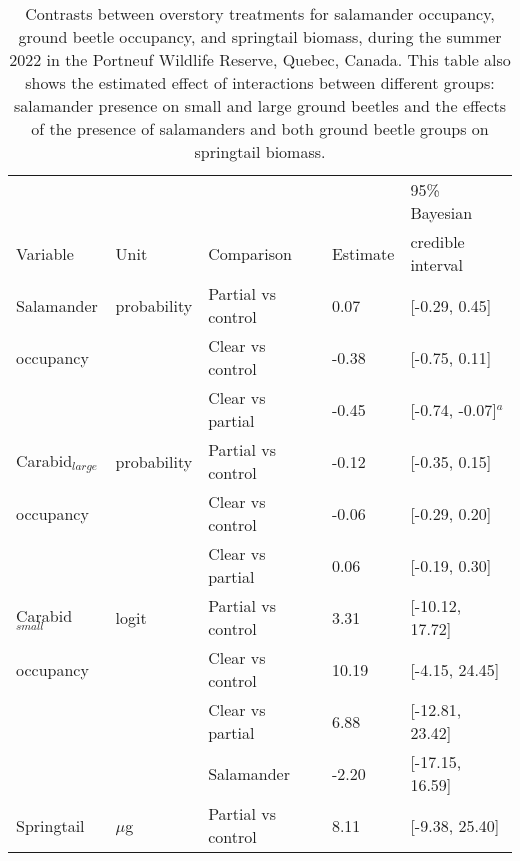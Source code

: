 \vspace{10pt}

\begin{table}[h!]
  \centering
  \caption[Contrasts between overstory treatments for salamander occupancy, ground beetle occupancy, and springtail biomass.]
  {Contrasts between overstory treatments for salamander occupancy, ground beetle occupancy, and springtail biomass, during the summer 2022 in the Portneuf Wildlife Reserve, Quebec, Canada. 
  This table also shows the estimated effect of interactions between different groups: salamander presence on small and large ground beetles and the effects of the presence of salamanders and both ground beetle groups on springtail biomass.}
  \label{tab:overstorysp}
  \begin{tabular}{lllll} 
      \hline
      &&&&95\% Bayesian \\
      Variable&Unit& Comparison & Estimate &  credible interval \\ [0.5ex] 
      \hline     
      Salamander           &probability& Partial vs control & \hspace{1mm}0.07 & [-0.29, 0.45] \\ 
      occupancy       && Clear vs control  & -0.38 & [-0.75, 0.11] \\ 
                          && Clear vs partial  & -0.45 & [-0.74, -0.07]$^{a}$ \\       
      Carabid$_{large}$ &probability& Partial vs control & -0.12 & [-0.35, 0.15] \\
      occupancy       && Clear vs control  & -0.06 & [-0.29, 0.20] \\ 
                          && Clear vs partial  & \hspace{1mm}0.06 & [-0.19, 0.30] \\ 
      Carabid$_{small}$    &logit& Partial vs control & \hspace{1mm}3.31 & [-10.12, 17.72] \\
      occupancy             && Clear vs control  & \hspace{1mm}10.19 & [-4.15, 24.45] \\ 
                          && Clear vs partial  & \hspace{1mm}6.88 & [-12.81, 23.42] \\  
                          && Salamander        & -2.20 & [-17.15, 16.59] \\  
      Springtail          &$\mu$g& Partial vs control & \hspace{1mm}8.11 & [-9.38, 25.40] \\

\end{tabular}
\end{table}
